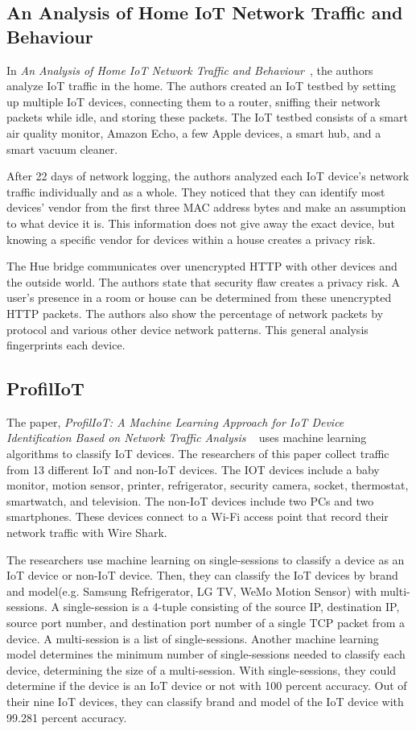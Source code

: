 \subsection{An Analysis of Home IoT Network Traffic and Behaviour}
\label{homeIoTPaper}
In \textit{An Analysis of Home IoT Network Traffic and Behaviour}~\cite{home_iot}, the authors analyze IoT traffic in the home. The authors created an IoT testbed by setting up multiple IoT devices, connecting them to a router, sniffing their network packets while idle, and storing these packets. The IoT testbed consists of a smart air quality monitor, Amazon Echo, a few Apple devices, a smart hub, and a smart vacuum cleaner.

After 22 days of network logging, the authors analyzed each IoT device's network traffic individually and as a whole. They noticed that they can identify most devices' vendor from the first three MAC address bytes and make an assumption to what device it is. This information does not give away the exact device, but knowing a specific vendor for devices within a house creates a privacy risk.

The Hue bridge communicates over unencrypted HTTP with other devices and the outside world. The authors state that security flaw creates a privacy risk. A user’s presence in a room or house can be determined from these unencrypted HTTP packets. The authors also show the percentage of network packets by protocol and various other device network patterns. This general analysis fingerprints each device.

\subsection{ProfilIoT}
\label{ProfilIoTPaper}
The paper, \textit{ProfilIoT: A Machine Learning Approach for IoT Device Identification Based on Network Traffic Analysis} ~\cite{Meidan:2017:PML:3019612.3019878} uses machine learning algorithms to classify IoT devices. The researchers of this paper collect traffic from 13 different IoT and non-IoT devices. The IOT devices include a baby monitor, motion sensor, printer, refrigerator, security camera, socket, thermostat, smartwatch, and television. The non-IoT devices include two PCs and two smartphones. These devices connect to a Wi-Fi access point that record their network traffic with Wire Shark\cite{wireshark}.

The researchers use machine learning on single-sessions to classify a device as an IoT device or non-IoT device. Then, they can classify the IoT devices by brand and model(e.g. Samsung Refrigerator, LG TV, WeMo Motion Sensor) with multi-sessions. A single-session is a 4-tuple consisting of the source IP, destination IP, source port number, and destination port number of a single TCP packet from a device. A multi-session is a list of single-sessions. Another machine learning model determines the minimum number of single-sessions needed to classify each device, determining the size of a multi-session. With single-sessions, they could determine if the device is an IoT device or not with 100 percent accuracy. Out of their nine IoT devices, they can classify brand and model of the IoT device with 99.281 percent accuracy.

